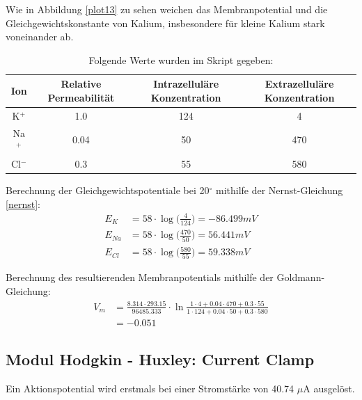 \documentclass[11pt]{article}
\begin{document}
Wie in Abbildung \ref{plot13} zu sehen weichen das Membranpotential und die Gleichgewichtskonstante von Kalium, insbesondere für kleine Kalium stark voneinander ab.

\begin{table}[H]
\caption{Folgende Werte wurden im Skript gegeben:}
\centering
\begin{adjustbox}{width=1.3\textwidth, center=\textwidth}
\begin{tabular}{c|c|c|c}
Ion & Relative Permeabilität & Intrazelluläre \newline Konzentration & Extrazelluläre \newline Konzentration\\ \hline\hline
K$^+$ & 1.0 & 124 & 4 \\ 
Na$^+$ & 0.04 & 50 & 470 \\
Cl$^-$ & 0.3 & 55 & 580
\end{tabular}
\end{adjustbox}
\label{werte-skript}
\end{table}

Berechnung der Gleichgewichtspotentiale bei 20$^\circ$ mithilfe der Nernst-Gleichung \ref{nernst}:
\begin{align}
E_K &= 58\cdot\log\bigg(\frac{4}{124}\bigg)= -86.499 mV\\
E_{Na} &= 58\cdot\log\bigg(\frac{470}{50}\bigg)=  56.441 mV\\
E_{Cl} &= 58\cdot\log\bigg(\frac{580}{55}\bigg)= 59.338 mV
\end{align}

Berechnung des resultierenden Membranpotentials mithilfe der Goldmann-Gleichung:
\begin{align}
V_m&=\frac{8.314\cdot 293.15}{96485.333}\cdot\ln\frac{1\cdot 4+0.04\cdot470+0.3\cdot55}{1\cdot 124+0.04\cdot50+0.3\cdot580}\\
&= -0.051
\end{align}

\subsection{Modul Hodgkin - Huxley: Current Clamp}
Ein Aktionspotential wird erstmals bei einer Stromstärke von 40.74 $\mu$A ausgelöst.
\end{document}
